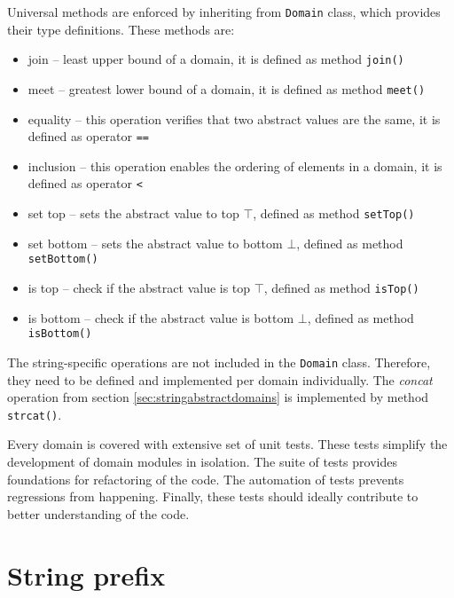 \documentclass[12pt,final,oneside]{fithesis2}
\theoremstyle{definition}
\begin{document}
Universal methods are enforced by inheriting from \texttt{Domain} class,
which provides their type definitions. These methods are:

\begin{itemize}

\item join -- least upper bound of a domain, it is defined as method
\texttt{join()}

\item meet -- greatest lower bound of a domain, it is defined as method
\texttt{meet()}

\item equality -- this operation verifies that two abstract values are the same,
it is defined as operator \texttt{==}

\item inclusion -- this operation enables the ordering of elements in a domain,
it is defined as operator \texttt{<}

\item set top -- sets the abstract value to top $\top$, defined as method
\texttt{setTop()}

\item set bottom -- sets the abstract value to bottom $\bot$, defined as method
\texttt{setBottom()}

\item is top -- check if the abstract value is top $\top$, defined as method
\texttt{isTop()}

\item is bottom -- check if the abstract value is bottom $\bot$, defined as
method \texttt{isBottom()}

\end{itemize}

The string-specific operations are not included in the \texttt{Domain} class.
Therefore, they need to be defined and implemented per domain individually.
The \textit{concat} operation from section \ref{sec:stringabstractdomains} is
implemented by method \texttt{strcat()}.

Every domain is covered with extensive set of unit tests. These tests simplify
the development of domain modules in isolation. The suite of tests provides
foundations for refactoring of the code. The automation of tests
prevents regressions from happening. Finally, these tests should ideally
contribute to better understanding of the code.


\section{String prefix}
\end{document}

